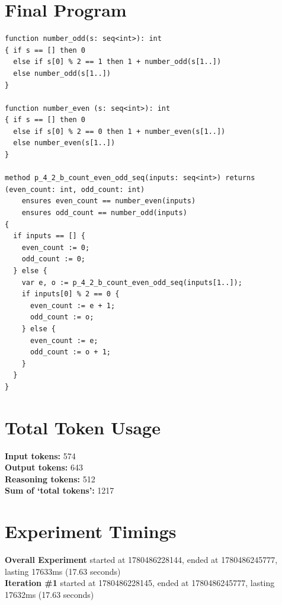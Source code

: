 \documentclass{article}
\begin{document}
\section*{Final Program}
\begin{lstlisting}
function number_odd(s: seq<int>): int
{ if s == [] then 0
  else if s[0] % 2 == 1 then 1 + number_odd(s[1..])
  else number_odd(s[1..])
}

function number_even (s: seq<int>): int
{ if s == [] then 0
  else if s[0] % 2 == 0 then 1 + number_even(s[1..])
  else number_even(s[1..])
}

method p_4_2_b_count_even_odd_seq(inputs: seq<int>) returns (even_count: int, odd_count: int)
	ensures even_count == number_even(inputs)
	ensures odd_count == number_odd(inputs)
{
  if inputs == [] {
    even_count := 0;
    odd_count := 0;
  } else {
    var e, o := p_4_2_b_count_even_odd_seq(inputs[1..]);
    if inputs[0] % 2 == 0 {
      even_count := e + 1;
      odd_count := o;
    } else {
      even_count := e;
      odd_count := o + 1;
    }
  }
}
\end{lstlisting}
\section*{Total Token Usage}
\textbf{Input tokens: }574
\\\textbf{Output tokens: }643
\\\textbf{Reasoning tokens: }512
\\\textbf{Sum of `total tokens': }1217
\section*{Experiment Timings}
\textbf{Overall Experiment} started at 1780486228144, ended at 1780486245777, lasting 17633ms (17.63 seconds)
\\\textbf{Iteration \#1} started at 1780486228145, ended at 1780486245777, lasting 17632ms (17.63 seconds)
\end{document}
